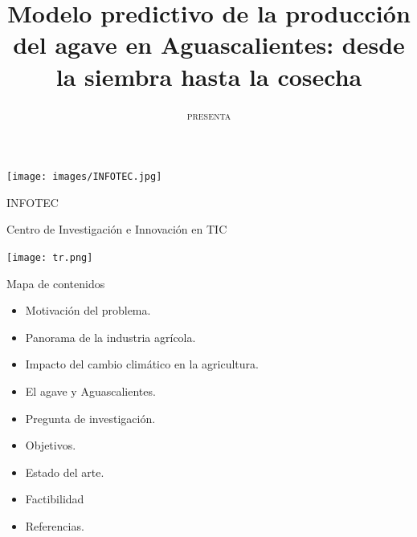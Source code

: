 \documentclass[aspectratio=169]{beamer}
\title[]{\Large\centering
\color{airforceblue}Modelo predictivo de la producción del agave en Aguascalientes: desde la siembra hasta la cosecha}
\author{{\small \textsc{presenta}}\centering{\\Isaac Vázquez Mendoza \\ {\small\textsc{
		bajo la dirección de}}\\ Dra. Magali Arellano Vázquez}}
\institute{}
\begin{document}
	\begin{frame}[noframenumbering]
		
		\begin{minipage}{0.15\textwidth}
			\centering
			\hspace{0.3cm}\vspace{-0.6cm}\texttt{[image: images/INFOTEC.jpg]}
		\end{minipage}%
		\begin{minipage}{0.65\textwidth}
			\centering \vspace{0.5cm}
			\hspace{1cm}INFOTEC
			
			\hspace{1cm}Centro de Investigación e Innovación en TIC
                \hspace{1cm}
   
		\end{minipage}%
		\begin{minipage}{0.2\textwidth}
			\texttt{[image: tr.png]}
                \hspace*{0.5cm}%
		\end{minipage}
		\date{}
		\titlepage
		
		
		
	\end{frame}
%
%


%
%



{
	\vspace{-2cm}\begin{frame}{Mapa de contenidos}
		\begin{itemize}
			\color{airforceblue}
			\item Motivación del problema.
			\item Panorama de la industria agrícola.
			\item Impacto del cambio climático en la agricultura.
			\item El agave y Aguascalientes.
			\item Pregunta de investigación.
			\item Objetivos.
			\item Estado del arte.
			\item Factibilidad
			\item Referencias.
		\end{itemize}
	\end{frame}
}
\end{document}
